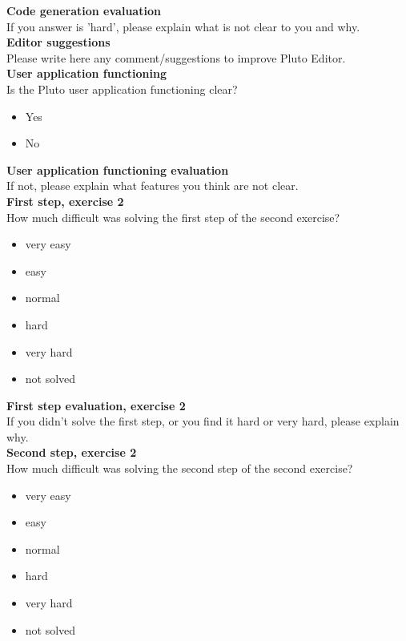 \textbf{Code generation evaluation}
\\

If you answer is 'hard', please explain what is not clear to you and why.
\\ 

\textbf{Editor suggestions}
\\

Please write here any comment/suggestions to improve Pluto Editor.
\\ 

\textbf{User application functioning}
\\

Is the Pluto user application functioning clear?


\begin{itemize}
\item{Yes}
\item{No}
\end{itemize}

\textbf{User application functioning evaluation}
\\

If not, please explain what features you think are not clear.
\\ 

\textbf{First step, exercise 2}
\\

How much difficult was solving the first step of the second exercise?


\begin{itemize}
\item{very easy}
\item{easy}
\item{normal}
\item{hard}
\item{very hard}
\item{not solved}

\end{itemize}

\textbf{First step evaluation, exercise 2}
\\

If you didn't solve the first step, or you find it hard or very hard, please explain why.
\\ 

\textbf{Second step, exercise 2}
\\

How much difficult was solving the second step of the second exercise?
 

\begin{itemize}
\item{very easy}
\item{easy}
\item{normal}
\item{hard}
\item{very hard}
\item{not solved}

\end{itemize}

